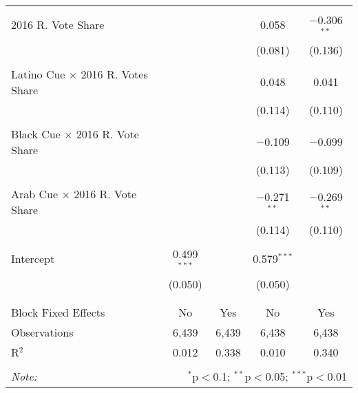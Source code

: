 \begin{table}[!htbp]
\begin{tabular}{@{\extracolsep{5pt}}lcccc}
  & & & & \\ 
 2016 R. Vote Share &  &  & 0.058 & $-$0.306$^{**}$ \\ 
  &  &  & (0.081) & (0.136) \\ 
  & & & & \\ 
 Latino Cue $\times$ 2016 R. Votes Share &  &  & 0.048 & 0.041 \\ 
  &  &  & (0.114) & (0.110) \\ 
  & & & & \\ 
 Black Cue $\times$ 2016 R. Vote Share &  &  & $-$0.109 & $-$0.099 \\ 
  &  &  & (0.113) & (0.109) \\ 
  & & & & \\ 
 Arab Cue $\times$ 2016 R. Vote Share &  &  & $-$0.271$^{**}$ & $-$0.269$^{**}$ \\ 
  &  &  & (0.114) & (0.110) \\ 
  & & & & \\ 
 Intercept & 0.499$^{***}$ &  & 0.579$^{***}$ &  \\ 
  & (0.050) &  & (0.050) &  \\ 
  & & & & \\ 
\hline \\[-1.8ex] 
Block Fixed Effects & No & Yes & No & Yes \\ 
Observations & 6,439 & 6,439 & 6,438 & 6,438 \\ 
R$^{2}$ & 0.012 & 0.338 & 0.010 & 0.340 \\ 
\hline 
\hline \\[-1.8ex] 
\textit{Note:}  & \multicolumn{4}{r}{$^{*}$p$<$0.1; $^{**}$p$<$0.05; $^{***}$p$<$0.01} \\ 
\end{tabular} 
\end{table} 
